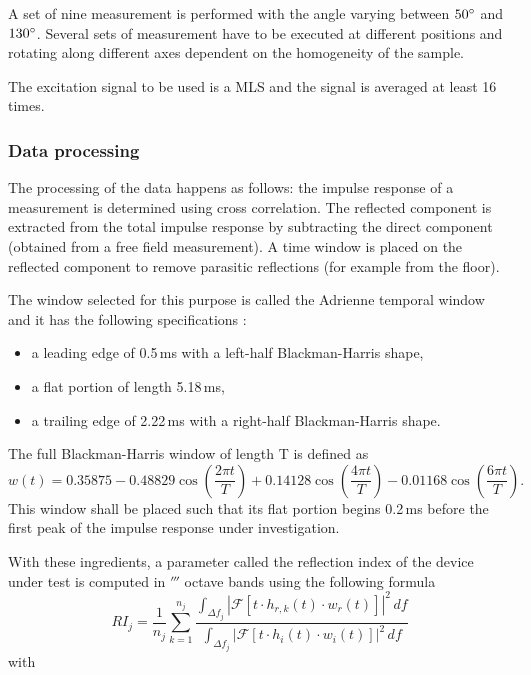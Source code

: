 A set of nine measurement is performed with the angle varying between $50^{\circ}$ and $130^{\circ}$. Several sets of measurement have to be executed at different positions and rotating along different axes dependent on the homogeneity of the sample.

The excitation signal to be used is a MLS and the signal is averaged at least 16 times.


\subsubsection{Data processing}\label{adrwindow}
The processing of the data happens as follows: the impulse response of a measurement is determined using cross correlation. The reflected component is extracted from the total impulse response by subtracting the direct component (obtained from a free field measurement). A time window is placed on the reflected component to remove parasitic reflections (for example from the floor).

The window selected for this purpose is called the Adrienne temporal window and it has the following specifications \cite{Adrienne}:
\begin{itemize}
	\setlength{\itemsep}{1pt}
  \setlength{\parskip}{0pt}
  \setlength{\parsep}{0pt}
	\item a leading edge of 0.5\,ms with a left-half Blackman-Harris shape,
	\item a flat portion of length 5.18\,ms,
	\item a trailing edge of 2.22\,ms with a right-half Blackman-Harris shape.
\end{itemize}
The full Blackman-Harris window of length T is defined as 
\[
w(t) = 0.35875 - 0.48829 \cos\left(\frac{2 \pi t}{T}\right) + 0.14128 \cos\left(\frac{4 \pi t}{T}\right) - 0.01168 \cos\left(\frac{6 \pi t}{T}\right).
\]
This window shall be placed such that its flat portion begins 0.2\,ms before the first peak of the impulse response under investigation.

With these ingredients, a parameter called the reflection index of the device under test is computed in $\third$ octave bands using the following formula
\begin{equation}
RI_j = \frac{1}{n_j} \sum^{n_j}_{k=1} \frac{\int_{\Delta f_j} \left|\mathcal{F}\left[t\cdot h_{r,k}(t)\cdot w_r(t)\right]\right|^2 \,df }{\int_{\Delta f_j} \left|\mathcal{F}\left[t \cdot h_{i}(t) \cdot w_i(t)\right]\right|^2 \,df }
\label{RI}
\end{equation}
with \\


